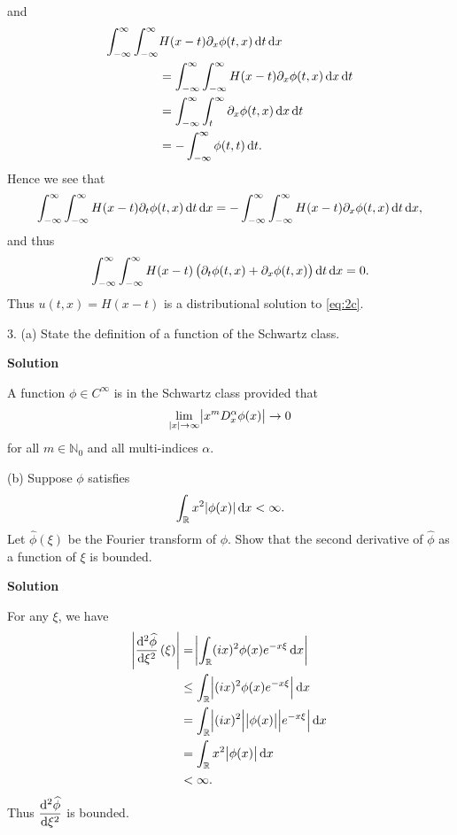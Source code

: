 \documentclass{article}
\begin{document}
%
and
%
\begin{align*}
    \int_{-\infty}^\infty \int_{-\infty}^\infty& H(x - t) \partial_x \phi(t, x) \dif t \dif x \\
        &= \int_{-\infty}^\infty \int_{-\infty}^\infty H(x - t) \partial_x \phi(t, x) \dif x \dif t \\
        &= \int_{-\infty}^\infty \int_t^\infty \partial_x \phi(t, x) \dif x \dif t \\
        &= - \int_{-\infty}^\infty \phi(t, t) \dif t
        .
\end{align*}
%
Hence we see that
%
\begin{equation*}
    \int_{-\infty}^\infty \int_{-\infty}^\infty H(x - t) \partial_t \phi(t, x) \dif t \dif x \\
    = -\int_{-\infty}^\infty \int_{-\infty}^\infty H(x - t) \partial_x \phi(t, x) \dif t \dif x
    ,
\end{equation*}
%
and thus
%
\begin{equation*}
    \int_{-\infty}^\infty \int_{-\infty}^\infty
        H(x - t) \del{\partial_t \phi(t, x) + \partial_x \phi(t, x)}
    \dif t \dif x
    = 0
    .
\end{equation*}
%
Thus $u(t, x) = H(x - t)$ is a distributional solution to \eqref{eq:2c}.

\newpage

3. (a) State the definition of a function of the Schwartz class.

\textbf{Solution}

A function $\phi \in C^\infty$ is in the Schwartz class provided that
%
\begin{equation*}
    \lim_{|x| \to \infty} \envert{x^m D_x^\alpha \phi(x)} \to 0
\end{equation*}
%
for all $m \in \mathbb{N}_0$ and all multi-indices $\alpha$.

\vspace{5mm}

(b) Suppose $\phi$ satisfies
%
\begin{equation*}
    \int_{\mathbb{R}} x^2 |\phi(x)| \dif x < \infty
    .
\end{equation*}
%
Let $\widehat{\phi}(\xi)$ be the Fourier transform of $\phi$. Show that
the second derivative of $\widehat{\phi}$ as a function of $\xi$ is
bounded.

\textbf{Solution}

For any $\xi$, we have
%
\begin{align*}
    \envert{\dod[2]{\widehat{\phi}}{\xi}(\xi)}
        &= \envert{\int_\mathbb{R} (i x)^2 \phi(x) e^{- x \xi} \dif x} \\
        &\leq \int_\mathbb{R} \envert{(i x)^2 \phi(x) e^{- x \xi}} \dif x \\
        &= \int_\mathbb{R} \envert{(i x)^2} \envert{\phi(x)} \envert{e^{- x \xi}} \dif x \\
        &= \int_\mathbb{R} x^2 \envert{\phi(x)} \dif x \\
        &< \infty
        .
\end{align*}
%
Thus $\dod[2]{\widehat{\phi}}{\xi}$ is bounded.
\end{document}
